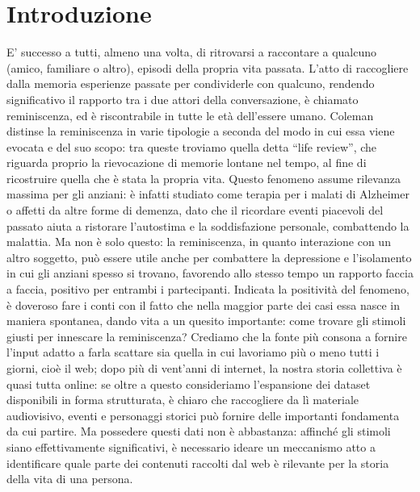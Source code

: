 \documentclass[sigproc-sp.tex]{subfiles}
\begin{document}
\section{Introduzione}
E’ successo a tutti, almeno una volta, di ritrovarsi a raccontare a qualcuno (amico, familiare o altro), episodi della propria vita passata. L’atto di raccogliere dalla memoria esperienze passate per condividerle con qualcuno, rendendo significativo il rapporto tra i due attori della conversazione, è chiamato reminiscenza, ed è riscontrabile in tutte le età dell’essere umano.
Coleman distinse la reminiscenza in varie tipologie a seconda del modo in cui essa viene evocata e del suo scopo: tra queste troviamo quella detta “life review”, che riguarda proprio la rievocazione di memorie lontane nel tempo, al fine di ricostruire quella che è stata la propria vita\cite{coleman1974measuring}.
Questo fenomeno assume rilevanza massima per gli anziani: è infatti studiato come terapia per i malati di Alzheimer o affetti da altre forme di demenza, dato che il ricordare eventi piacevoli del passato aiuta a ristorare l’autostima e la soddisfazione personale, combattendo la malattia.
Ma non è solo questo: la reminiscenza, in quanto interazione con un altro soggetto, può essere utile anche per combattere la depressione e l’isolamento in cui gli anziani spesso si trovano, favorendo allo stesso tempo un rapporto faccia a faccia, positivo per entrambi i partecipanti.
Indicata la positività del fenomeno, è doveroso fare i conti con il fatto che nella maggior parte dei casi essa nasce in maniera spontanea, dando vita a un quesito importante: come trovare gli stimoli giusti per innescare la reminiscenza? Crediamo che la fonte più consona a fornire l’input adatto a farla scattare sia quella in cui lavoriamo più o meno tutti i giorni, cioè il web; dopo più di vent’anni di internet, la nostra storia collettiva è quasi tutta online: se oltre a questo consideriamo l’espansione dei dataset disponibili in forma strutturata, è chiaro che raccogliere da lì materiale audiovisivo, eventi e personaggi storici può fornire delle importanti fondamenta da cui partire.
Ma possedere questi dati non è abbastanza: affinché gli stimoli siano effettivamente significativi, è necessario ideare un meccanismo atto a identificare quale parte dei contenuti raccolti dal web è rilevante per la storia della vita di una persona.
\end{document}
